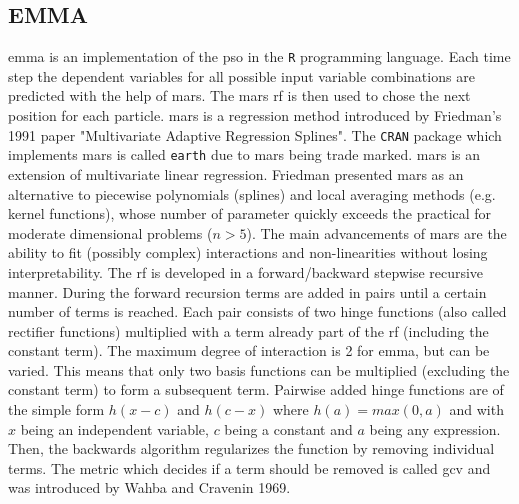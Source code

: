 \subsection{EMMA}
\Gls{emma} is an implementation of the \gls{pso} in the \texttt{R} programming language. 
Each time step the dependent variables for all possible input variable combinations %
are predicted with the help of \gls{mars}. 
The \gls{mars} \gls{rf} is then used to chose the next position for each particle.
\Gls{mars} is a regression method introduced by Friedman's 1991 paper 
"Multivariate Adaptive Regression Splines"\cite{friedman1991multivariate}. 
The \texttt{CRAN} package which implements \gls{mars} is called \texttt{earth} due to \gls{mars} being trade marked\cite{mars}.
\gls{mars} is an extension of multivariate linear regression.
Friedman presented \gls{mars} as an alternative to piecewise polynomials (splines) and local averaging methods (e.g. kernel functions), whose number of parameter quickly exceeds the practical for moderate dimensional problems ($n>5$). 
%
%
The main advancements of \gls{mars} are the ability to fit (possibly complex) interactions and non-linearities without losing interpretability. 
%
%
The \gls{rf} is developed in a forward/backward stepwise recursive manner\cite{friedman1988fitting}. 
During the forward recursion terms are added in pairs until a certain number of terms is reached. 
Each pair consists of two hinge functions (also called rectifier functions) multiplied with a term already part of the \gls{rf} (including the constant term).
The maximum degree of interaction is 2 for \gls{emma}, but can be varied. 
This means that only two basis functions can be multiplied (excluding the constant term) to form a subsequent term.
Pairwise added hinge functions are of the simple form $h(x-c)$ and $h(c-x)$ where $h(a)= max(0,a)$ and with $x$ being an independent variable, $c$ being a constant and $a$ being any expression. 
Then, the backwards algorithm regularizes the function by removing individual terms. 
The metric which decides if a term should be removed is called \gls{gcv} and was introduced by Wahba and Cravenin 1969\cite{wahba1979smoothing}.

